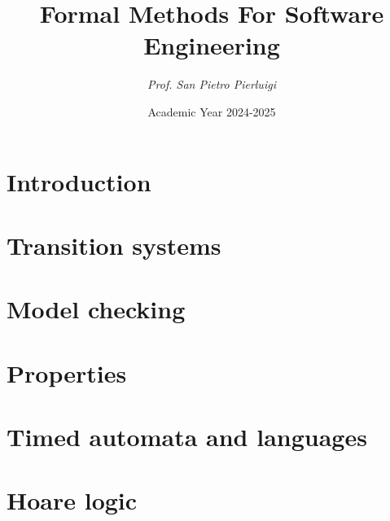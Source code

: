 \documentclass[12pt, a4paper]{report}
\title{\textbf{Formal Methods For Software Engineering}}
\author{\textit{Prof. San Pietro Pierluigi}}
\date{Academic Year 2024-2025}
\begin{document}
    \maketitle

    

    \cleardoublepage{}

    \tableofcontents

    \cleardoublepage{}

    \chapter{Introduction}
    
    
    

    \chapter{Transition systems}
    
    
    
    
    
    

    \chapter{Model checking}
    
    
    
    
    
    
    
    

    \chapter{Properties}
    
    

    \chapter{Timed automata and languages}
    
    
    
    
    
    

    \chapter{Hoare logic}
    
    
    
    
\end{document}
